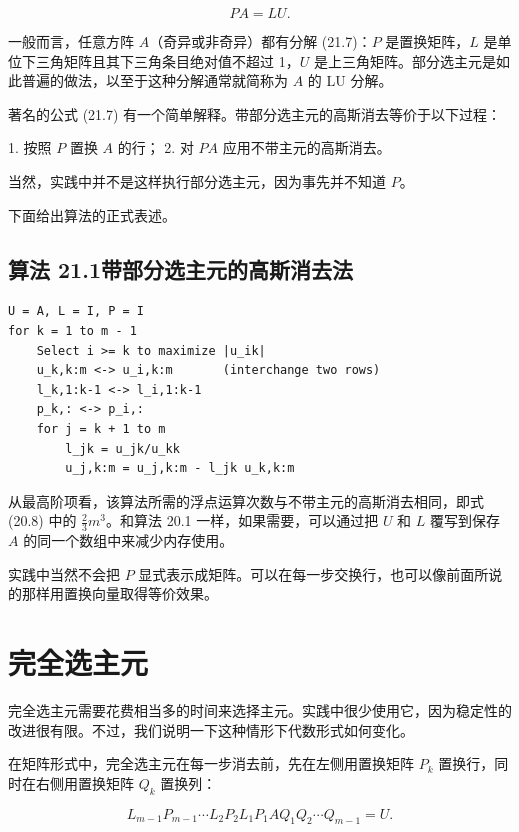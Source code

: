 \documentclass[UTF8,fontset=none,12pt]{ctexart}
\theoremstyle{definition}
\begin{document}
\begin{equation}
PA=LU.
\tag{21.7}
\end{equation}

一般而言，任意方阵 $A$（奇异或非奇异）都有分解 (21.7)：$P$ 是置换矩阵，$L$ 是单位下三角矩阵且其下三角条目绝对值不超过 1，$U$ 是上三角矩阵。部分选主元是如此普遍的做法，以至于这种分解通常就简称为 $A$ 的 LU 分解。

著名的公式 (21.7) 有一个简单解释。带部分选主元的高斯消去等价于以下过程：

1. 按照 $P$ 置换 $A$ 的行；
2. 对 $PA$ 应用不带主元的高斯消去。

当然，实践中并不是这样执行部分选主元，因为事先并不知道 $P$。

下面给出算法的正式表述。

\subsection*{算法 21.1\quad 带部分选主元的高斯消去法}

\begin{verbatim}
U = A, L = I, P = I
for k = 1 to m - 1
    Select i >= k to maximize |u_ik|
    u_k,k:m <-> u_i,k:m       (interchange two rows)
    l_k,1:k-1 <-> l_i,1:k-1
    p_k,: <-> p_i,:
    for j = k + 1 to m
        l_jk = u_jk/u_kk
        u_j,k:m = u_j,k:m - l_jk u_k,k:m
\end{verbatim}

从最高阶项看，该算法所需的浮点运算次数与不带主元的高斯消去相同，即式 (20.8) 中的 $\frac23m^3$。和算法 20.1 一样，如果需要，可以通过把 $U$ 和 $L$ 覆写到保存 $A$ 的同一个数组中来减少内存使用。

实践中当然不会把 $P$ 显式表示成矩阵。可以在每一步交换行，也可以像前面所说的那样用置换向量取得等价效果。

\section*{完全选主元}

完全选主元需要花费相当多的时间来选择主元。实践中很少使用它，因为稳定性的改进很有限。不过，我们说明一下这种情形下代数形式如何变化。

在矩阵形式中，完全选主元在每一步消去前，先在左侧用置换矩阵 $P_k$ 置换行，同时在右侧用置换矩阵 $Q_k$ 置换列：

\begin{equation}
L_{m-1}P_{m-1}\cdots L_2P_2L_1P_1
A Q_1Q_2\cdots Q_{m-1}=U.
\tag{21.8}
\end{equation}
\end{document}
